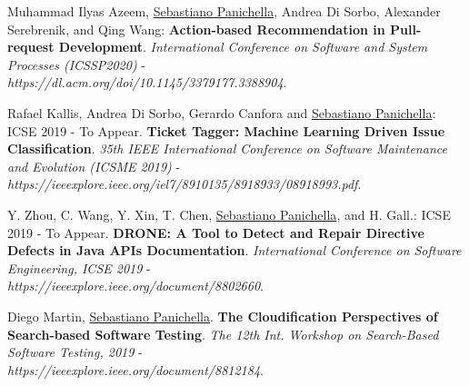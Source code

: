 \documentclass[10pt]{article}
\begin{document}
\begin{bibenum}
      \item \label{Cm12}  Muhammad Ilyas Azeem, \underline{Sebastiano Panichella}, Andrea Di Sorbo, Alexander Serebrenik, and Qing Wang:  \textbf{Action-based Recommendation in Pull-request Development}.  \emph{International Conference on Software and System Processes (ICSSP2020)} - \\\textit{https://dl.acm.org/doi/10.1145/3379177.3388904}. %

      \item \label{Cm11}  Rafael Kallis, Andrea Di Sorbo, Gerardo Canfora and \underline{Sebastiano Panichella}:   ICSE 2019 - To Appear. \textbf{Ticket Tagger: Machine Learning Driven Issue Classification}.  \emph{35th IEEE International Conference on Software Maintenance and Evolution (ICSME 2019)} - \\\textit{https://ieeexplore.ieee.org/iel7/8910135/8918933/08918993.pdf}. %
      \item \label{Cm10}  Y. Zhou, C. Wang, Y. Xin, T. Chen, \underline{Sebastiano Panichella}, and H. Gall.:   ICSE 2019 - To Appear. \textbf{DRONE: A Tool to Detect and Repair Directive Defects in Java APIs Documentation}.  \emph{International Conference on Software Engineering, ICSE 2019} - \\\textit{https://ieeexplore.ieee.org/document/8802660}. %
      
            \item \label{Cm9}  Diego Martin,  \underline{Sebastiano Panichella}. \textbf{The Cloudification Perspectives of Search-based Software Testing}.  \emph{The 12th Int. Workshop on Search-Based Software Testing, 2019} - \\\textit{https://ieeexplore.ieee.org/document/8812184}.


\end{bibenum}
\end{document}
